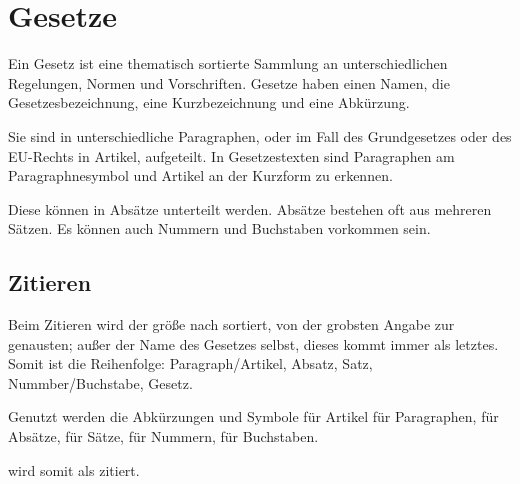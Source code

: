 \documentclass{article}
\begin{document}
\section{Gesetze}
Ein Gesetz ist eine thematisch sortierte Sammlung an unterschiedlichen Regelungen, Normen und Vorschriften. Gesetze haben einen Namen, die Gesetzesbezeichnung, eine Kurzbezeichnung und eine Abkürzung.

Sie sind in unterschiedliche Paragraphen, oder im Fall des Grundgesetzes oder des EU-Rechts in Artikel, aufgeteilt. In Gesetzestexten sind Paragraphen am Paragraphnesymbol  und Artikel an der Kurzform  zu erkennen.

Diese können in Absätze  unterteilt werden. Absätze bestehen oft aus mehreren Sätzen. Es können auch Nummern  und Buchstaben  vorkommen sein.


\subsection{Zitieren}
Beim Zitieren wird der größe nach sortiert, von der grobsten Angabe zur genausten; außer der Name des Gesetzes selbst, dieses kommt immer als letztes. Somit ist die Reihenfolge: Paragraph/Artikel, Absatz, Satz, Nummber/Buchstabe, Gesetz.

Genutzt werden die Abkürzungen und Symbole \textquote{\art{}} für Artikel \textquote{\para{}} für Paragraphen, \absa{} für Absätze, \textquote{\satz} für Sätze, \textquote{\nr} für Nummern, \textquote{\lit} für Buchstaben.

 wird somit als    \GG zitiert.

\end{document}
